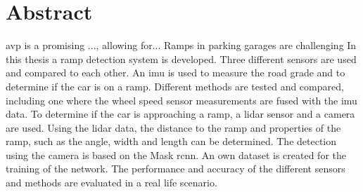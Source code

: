 \chapter*{Abstract}
\label{ch:Abstract}
\gls{avp} is a promising ..., allowing for...
Ramps in parking garages are challenging
In this thesis a ramp detection system is developed.
Three different sensors are used and compared to each other.
An \gls{imu} is used to measure the road grade and to determine if the car is on a ramp.
Different methods are tested and compared, including one where the wheel speed sensor measurements are fused with the \gls{imu} data.
To determine if the car is approaching a ramp, a \gls{lidar} sensor and a camera are used.
Using the \gls{lidar} data, the distance to the ramp and properties of the ramp, such as the angle, width and length can be determined.
The detection using the camera is based on the Mask \gls{rcnn}.
An own dataset is created for the training of the network.
The performance and accuracy of the different sensors and methods are evaluated in a real life scenario.
